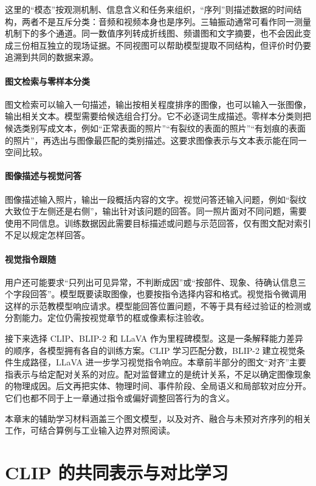 这里的“模态”按观测机制、信息含义和任务来组织，“序列”则描述数据的时间结构，两者不是互斥分类：音频和视频本身也是序列。三轴振动通常可看作同一测量机制下的多个通道。同一数值序列转成折线图、频谱图和文字摘要，也不会因此变成三份相互独立的现场证据。不同视图可以帮助模型提取不同结构，但评价时仍要追溯到共同的数据来源。

\paragraph{图文检索与零样本分类}
图文检索可以输入一句描述，输出按相关程度排序的图像，也可以输入一张图像，输出相关文本。模型需要给候选组合打分。它不必逐词生成描述。零样本分类则把候选类别写成文本，例如“正常表面的照片”“有裂纹的表面的照片”“有划痕的表面的照片”，再选出与图像最匹配的类别描述。这要求图像表示与文本表示能在同一空间比较。

\paragraph{图像描述与视觉问答}
图像描述输入照片，输出一段概括内容的文字。视觉问答还输入问题，例如“裂纹大致位于左侧还是右侧”，输出针对该问题的回答。同一照片面对不同问题，需要使用不同信息。训练数据因此需要目标描述或问题与示范回答，仅有图文配对索引不足以规定怎样回答。

\paragraph{视觉指令跟随}
用户还可能要求“只列出可见异常，不判断成因”或“按部件、现象、待确认信息三个字段回答”。模型既要读取图像，也要按指令选择内容和格式。视觉指令微调用这样的示范教模型响应请求。模型能回答位置问题，不等于具有经过验证的检测或分割能力。定位仍需按视觉章节的框或像素标注验收。

接下来选择 CLIP、BLIP-2 和 LLaVA 作为里程碑模型。这是一条解释能力差异的顺序，各模型拥有各自的训练方案。CLIP 学习匹配分数，BLIP-2 建立视觉条件生成路径，LLaVA 进一步学习视觉指令响应。本章前半部分的图文“对齐”主要指表示与给定配对关系的对应。配对监督建立的是统计关系，不足以确定图像现象的物理成因。后文再把实体、物理时间、事件阶段、全局语义和局部软对应分开。它们也都不同于上一章通过指令或偏好调整回答行为的含义。

本章末的辅助学习材料涵盖三个图文模型，以及对齐、融合与未预对齐序列的相关工作，可结合算例与工业输入边界对照阅读。

\section{CLIP 的共同表示与对比学习}
